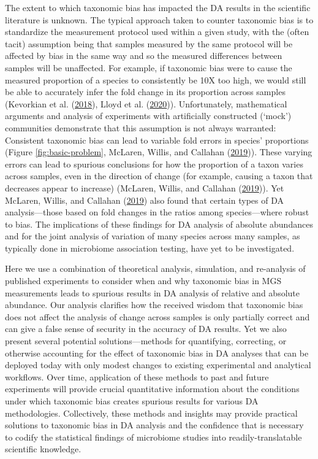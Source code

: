 \documentclass[
]{article}
\begin{document}
The extent to which taxonomic bias has impacted the DA results in the scientific literature is unknown.
The typical approach taken to counter taxonomic bias is to standardize the measurement protocol used within a given study, with the (often tacit) assumption being that samples measured by the same protocol will be affected by bias in the same way and so the measured differences between samples will be unaffected.
For example, if taxonomic bias were to cause the measured proportion of a species to consistently be 10X too high, we would still be able to accurately infer the fold change in its proportion across samples (Kevorkian et al. (\protect\hyperlink{ref-kevorkian2018esti}{2018}), Lloyd et al. (\protect\hyperlink{ref-lloyd2020evid}{2020})).
Unfortunately, mathematical arguments and analysis of experiments with artificially constructed (`mock') communities demonstrate that this assumption is not always warranted:
Consistent taxonomic bias can lead to variable fold errors in species' proportions (Figure \ref{fig:basic-problem}, McLaren, Willis, and Callahan (\protect\hyperlink{ref-mclaren2019cons}{2019})).
These varying errors can lead to spurious conclusions for how the proportion of a taxon varies across samples, even in the direction of change (for example, causing a taxon that decreases appear to increase) (McLaren, Willis, and Callahan (\protect\hyperlink{ref-mclaren2019cons}{2019})).
Yet McLaren, Willis, and Callahan (\protect\hyperlink{ref-mclaren2019cons}{2019}) also found that certain types of DA analysis---those based on fold changes in the ratios among species---where robust to bias.
The implications of these findings for DA analysis of absolute abundances and for the joint analysis of variation of many species across many samples, as typically done in microbiome association testing, have yet to be investigated.

Here we use a combination of theoretical analysis, simulation, and re-analysis of published experiments to consider when and why taxonomic bias in MGS measurements leads to spurious results in DA analysis of relative and absolute abundance.
Our analysis clarifies how the received wisdom that taxonomic bias does not affect the analysis of change across samples is only partially correct and can give a false sense of security in the accuracy of DA results.
Yet we also present several potential solutions---methods for quantifying, correcting, or otherwise accounting for the effect of taxonomic bias in DA analyses that can be deployed today with only modest changes to existing experimental and analytical workflows.
Over time, application of these methods to past and future experiments will provide crucial quantitative information about the conditions under which taxonomic bias creates spurious results for various DA methodologies.
Collectively, these methods and insights may provide practical solutions to taxonomic bias in DA analysis and the confidence that is necessary to codify the statistical findings of microbiome studies into readily-translatable scientific knowledge.
\end{document}
